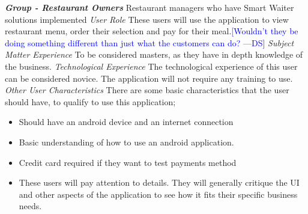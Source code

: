 \documentclass[12pt, titlepage]{article}
\newcommand{\authornote}[3]{\textcolor{#1}{[#3 ---#2]}}
\newcommand{\authornote}[3]{}
\newcommand{\ds}[1]{\authornote{blue}{DS}{#1}}
\begin{document}
\noindent\textbf{\textit{Group - Restaurant Owners}}\newline
Restaurant managers who have Smart Waiter solutions implemented \newline
\newline
\textit{User Role}\newline
These users will use the application to view restaurant menu, order their selection and pay for their meal.\ds{Wouldn't they be doing something different than just what the customers can do?}\newline\newline
\textit{Subject Matter Experience}\newline
To be considered masters, as they have in depth knowledge of the business. \newline\newline
\textit{Technological Experience}\newline
The technological experience of this user can be considered novice. The application will not require any training to use. \newline\newline
\textit{Other User Characteristics}\newline
There are some basic characteristics that the user should have, to qualify to use this application;
\begin{itemize}
  \item Should have an android device and an internet connection
  \item Basic understanding of how to use an android application. 
  \item 	Credit card required if they want to test payments method 
  \item 	These users will pay attention to details. They will generally critique the UI and other aspects of the application to see how it fits their specific business needs.
\end{itemize}
\end{document}
